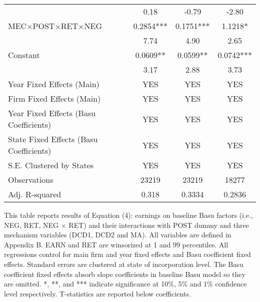 \begin{table}[H]
\begin{tabular}{lccc}
		& 0.18  & -0.79 & -2.80 \\
		\rowcolor[rgb]{ .851,  .851,  .851} MEC$\times$POST$\times$RET$\times$NEG & 0.2854*** & 0.1751*** & 1.1218* \\
		\rowcolor[rgb]{ .851,  .851,  .851}       & 7.74  & 4.90  & 2.65 \\
		Constant & 0.0609** & 0.0599** & 0.0742*** \\
		& 3.17  & 2.88  & 3.73 \\
		Year Fixed Effects (Main) & YES   & YES   & YES \\
		Firm Fixed Effects (Main) & YES   & YES   & YES \\
		Year Fixed Effects (Basu Coefficients) & YES   & YES   & YES \\
		State Fixed Effects (Basu Coefficients) & YES   & YES   & YES \\
		S.E. Clustered by States & YES   & YES   & YES \\
		Observations    & 23219 & 23219 & 18277 \\
		Adj. R-squared & 0.318 & 0.3334 & 0.2836 \\
		\bottomrule
		\bottomrule
	\end{tabular}%
\end{table}%
\noindent This table reports results of Equation (4): earnings on baseline Basu factors (i.e., NEG, RET, NEG $\times$ RET) and their interactions with POST dummy and three mechanism variables (DCD1, DCD2 and MA). All variables are defined in Appendix B. EARN and RET are winsorized at 1 and 99 percentiles. All regressions control for main firm and year fixed effects and Basu coefficient fixed effects. Standard errors are clustered at state of incorporation level. The Basu coefficient fixed effects absorb slope coefficients in baseline Basu model so they are omitted.  *, **, and *** indicate significance at 10\%, 5\% and 1\% confidence level respectively. T-statistics are reported below coefficients.

\restoregeometry

